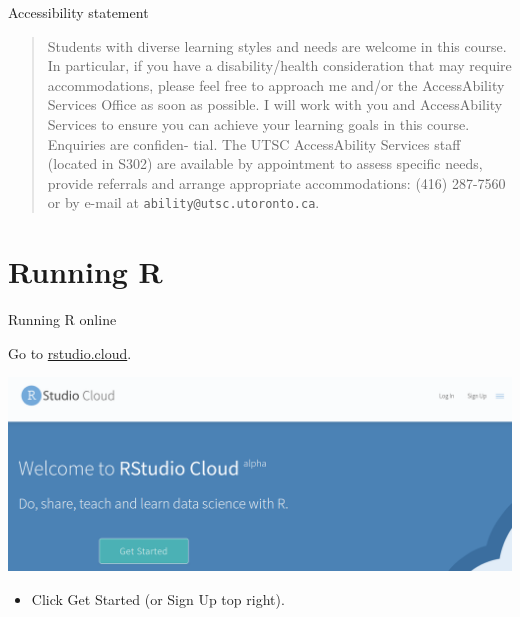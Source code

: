 \documentclass[ignorenonframetext,]{beamer}
\providecommand{\tightlist}{%
  \setlength{\itemsep}{0pt}\setlength{\parskip}{0pt}}
\begin{document}
\begin{frame}[fragile]{Accessibility statement}
\protect\hypertarget{accessibility-statement}{}

\begin{quote}
Students with diverse learning styles and needs are welcome in this
course. In particular, if you have a disability/health consideration
that may require accommodations, please feel free to approach me and/or
the AccessAbility Services Office as soon as possible. I will work with
you and AccessAbility Services to ensure you can achieve your learning
goals in this course. Enquiries are confiden- tial. The UTSC
AccessAbility Services staff (located in S302) are available by
appointment to assess specific needs, provide referrals and arrange
appropriate accommodations: (416) 287-7560 or by e-mail at
\texttt{ability@utsc.utoronto.ca}.
\end{quote}

\end{frame}

\hypertarget{running-r}{%
\section{Running R}\label{running-r}}

\begin{frame}{Running R online}
\protect\hypertarget{running-r-online}{}

Go to \href{https://rstudio.cloud}{rstudio.cloud}.

\includegraphics{Screenshot_2018-06-29_15-01-16.png}

\begin{itemize}
\tightlist
\item
  Click Get Started (or Sign Up top right).
\end{itemize}

\end{frame}
\end{document}
